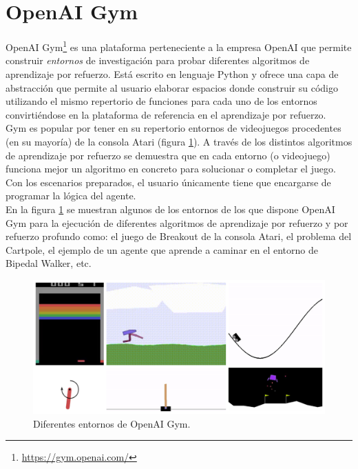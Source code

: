 \section{OpenAI Gym}

OpenAI Gym\footnote{\url{https://gym.openai.com/}} es una plataforma perteneciente a la empresa OpenAI que permite construir \textit{entornos} de investigación para probar diferentes algoritmos de aprendizaje por refuerzo. Está escrito en lenguaje Python y ofrece una capa de abstracción que permite al usuario elaborar espacios donde construir su código utilizando el mismo repertorio de funciones para cada uno de los entornos convirtiéndose en la plataforma de referencia en el aprendizaje por refuerzo.\\

Gym es popular por tener en su repertorio entornos de videojuegos procedentes (en su mayoría) de la consola Atari (figura \ref{fig:openai-gym}). A través de los distintos algoritmos de aprendizaje por refuerzo se demuestra que en cada entorno (o videojuego) funciona mejor un algoritmo en concreto para solucionar o completar el juego. Con los escenarios preparados, el usuario únicamente tiene que encargarse de programar la lógica del agente.\\

En la figura \ref{fig:openai-gym} se muestran algunos de los entornos de los que dispone OpenAI Gym para la ejecución de diferentes algoritmos de aprendizaje por refuerzo y por refuerzo profundo como: el juego de Breakout de la consola Atari, el problema del Cartpole, el ejemplo de un agente que aprende a caminar en el entorno de Bipedal Walker, etc.

\begin{figure}[!ht]
    \centering \includegraphics[width=1\columnwidth]{./figures/chapter_3/openaigym.jpg}
    \caption{Diferentes entornos de OpenAI Gym.\label{fig:openai-gym}}
\end{figure}

